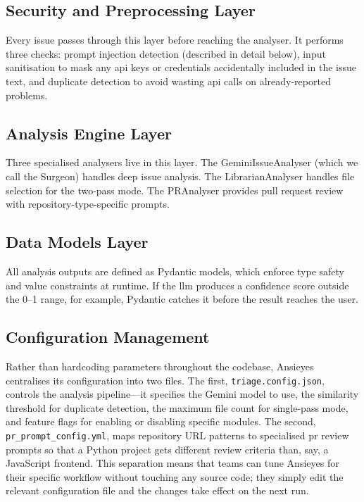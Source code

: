 \subsection{Security and Preprocessing Layer}
Every issue passes through this layer before reaching the analyser. It performs three checks: prompt injection detection (described in detail below), input sanitisation to mask any \gls{api} keys or credentials accidentally included in the issue text, and duplicate detection to avoid wasting \gls{api} calls on already-reported problems.

\subsection{Analysis Engine Layer}
Three specialised analysers live in this layer. The GeminiIssueAnalyser (which we call the Surgeon) handles deep issue analysis. The LibrarianAnalyser handles file selection for the two-pass mode. The PRAnalyser provides pull request review with repository-type-specific prompts.

\subsection{Data Models Layer}
All analysis outputs are defined as Pydantic models, which enforce type safety and value constraints at runtime. If the \gls{llm} produces a confidence score outside the 0--1 range, for example, Pydantic catches it before the result reaches the user.

\subsection{Configuration Management}
Rather than hardcoding parameters throughout the codebase, Ansieyes centralises its configuration into two files. The first, \texttt{triage.config.json}, controls the analysis pipeline---it specifies the Gemini model to use, the similarity threshold for duplicate detection, the maximum file count for single-pass mode, and feature flags for enabling or disabling specific modules. The second, \texttt{pr\_prompt\_config.yml}, maps repository URL patterns to specialised \gls{pr} review prompts so that a Python project gets different review criteria than, say, a JavaScript frontend. This separation means that teams can tune Ansieyes for their specific workflow without touching any source code; they simply edit the relevant configuration file and the changes take effect on the next run.

